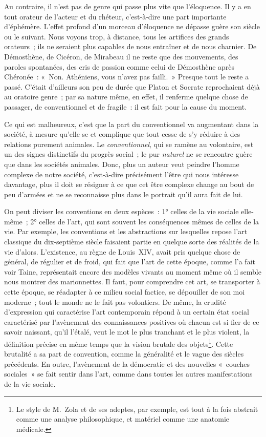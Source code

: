 \documentclass[french,twoside]{book} %
\begin{document}
Au contraire, il n’est pas de genre qui passe plus vite que l’éloquence. Il y a en tout orateur de l’acteur et du rhéteur, c’est-à-dire une part importante d’éphémère. L’effet profond d’un morceau d’éloquence ne dépasse guère son siècle ou le suivant. Nous voyons trop, à distance, tous les artifices des grands orateurs ; ils ne seraient plus capables de nous entraîner et de nous charnier. De Démosthène, de Cicéron, de Mirabeau il ne reste que des mouvements, des paroles spontanées, des cris de passion comme celui de Démosthène après Chéronée : « Non. Athéniens, vous n’avez pas failli. » Presque tout le reste a passé. C’était d’ailleurs son peu de durée que Platon et Socrate reprochaient déjà au oratoire genre ; par sa nature même, en effet, il renferme quelque chose de passager, de conventionnel et de fragile : il est fait pour la cause du moment.\par
Ce qui est malheureux, c’est que la part du conventionnel va augmentant dans la société, à mesure qu’elle se et complique que tout cesse de s’y réduire à des relations purement animales. Le \emph{conventionnel}, qui se ramène au volontaire, est un des signes distinctifs du progrès social ; le pur \emph{naturel} ne se rencontre guère que dans les sociétés animales. Donc, plus un auteur veut peindre l’homme complexe de notre société, c’est-à-dire précisément l’être qui nous intéresse davantage, plus il doit se résigner à ce que cet être complexe change au bout de peu d’armées et ne se reconnaisse plus dans le portrait qu’il aura fait de lui.\par
On peut diviser les conventions en deux espèces : 1° celles de la vie sociale elle-même ; 2° celles de l’art, qui sont souvent les conséquences mêmes de celles de la vie. Par exemple, les conventions et les abstractions sur lesquelles repose l’art classique du dix-septième siècle faisaient partie en quelque sorte des réalités de la vie d’alors. L’existence, au règne de Louis XIV, avait pris quelque chose de général, de régulier et de froid, qui fait que l’art de cette époque, comme l’a fait voir Taine, représentait encore des modèles vivants au moment même où il semble nous montrer des marionnettes. Il faut, pour comprendre cet art, se transporter à cette époque, se réadapter à ce milieu social factice, se dépouiller de son moi moderne ; tout le monde ne le fait pas volontiers. De même, la crudité d’expression qui caractérise l’art contemporain répond à un certain état social caractérisé par l’avènement des connaissances positives où chacun est si fier de ce savoir naissant, qu’il l’étalé, veut le mot le plus tranchant et le plus violent, la définition précise en même temps que la vision brutale des objets\footnote{Le style de M. Zola et de ses adeptes, par exemple, est tout à la fois abstrait comme une analyse philosophique, et matériel comme une anatomie médicale.}. Cette brutalité a sa part de convention, comme la généralité et le vague des siècles précédents. En outre, l’avènement de la démocratie et des nouvelles « couches sociales » se fait sentir dans l’art, comme dans toutes les autres manifestations de la vie sociale.\par
\end{document}
